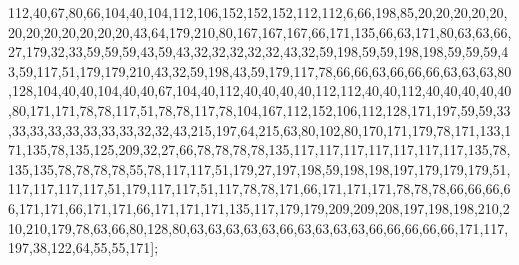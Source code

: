 112,40,67,80,66,104,40,104,112,106,152,152,152,112,112,6,66,198,85,20,20,20,20,20,20,20,20,20,20,20,20,43,64,179,210,80,167,167,167,66,171,135,66,63,171,80,63,63,66,27,179,32,33,59,59,59,43,59,43,32,32,32,32,32,43,32,59,198,59,59,198,198,59,59,59,43,59,117,51,179,179,210,43,32,59,198,43,59,179,117,78,66,66,63,66,66,66,63,63,63,80,128,104,40,40,104,40,40,67,104,40,112,40,40,40,40,112,112,40,40,112,40,40,40,40,40,80,171,171,78,78,117,51,78,78,117,78,104,167,112,152,106,112,128,171,197,59,59,33,33,33,33,33,33,33,33,32,32,43,215,197,64,215,63,80,102,80,170,171,179,78,171,133,171,135,78,135,125,209,32,27,66,78,78,78,78,135,117,117,117,117,117,117,117,135,78,135,135,78,78,78,78,55,78,117,117,51,179,27,197,198,59,198,198,197,179,179,179,51,117,117,117,117,51,179,117,117,51,117,78,78,171,66,171,171,171,78,78,78,66,66,66,66,171,171,66,171,171,66,171,171,171,135,117,179,179,209,209,208,197,198,198,210,210,210,179,78,63,66,80,128,80,63,63,63,63,63,66,63,63,63,63,66,66,66,66,66,171,117,197,38,122,64,55,55,171];

